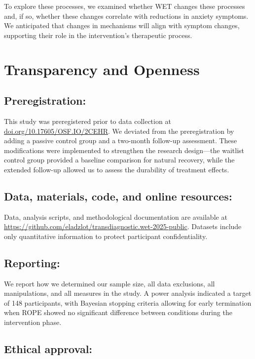 \documentclass[
  man,floatsintext]{apa7}
\begin{document}
To explore these processes, we examined whether WET changes these processes and, if so, whether these changes correlate with reductions in anxiety symptoms.
We anticipated that changes in mechanisms will align with symptom changes, supporting their role in the intervention's therapeutic process.

\section{Transparency and Openness}\label{transparency-and-openness}

\subsection{Preregistration:}\label{preregistration}

This study was preregistered prior to data collection at \url{doi.org/10.17605/OSF.IO/2CEHR}.
We deviated from the preregistration by adding a passive control group and a two-month follow-up assessment.
These modifications were implemented to strengthen the research design---the waitlist control group provided a baseline comparison for natural recovery, while the extended follow-up allowed us to assess the durability of treatment effects.

\subsection{Data, materials, code, and online resources:}\label{data-materials-code-and-online-resources}

Data, analysis scripts, and methodological documentation are available at \url{https://github.com/eladzlot/transdiagnostic.wet-2025-public}.
Datasets include only quantitative information to protect participant confidentiality.

\subsection{Reporting:}\label{reporting}

We report how we determined our sample size, all data exclusions, all manipulations, and all measures in the study.
A power analysis indicated a target of 148 participants, with Bayesian stopping criteria allowing for early termination when ROPE showed no significant difference between conditions during the intervention phase.

\subsection{Ethical approval:}\label{ethical-approval}
\end{document}

